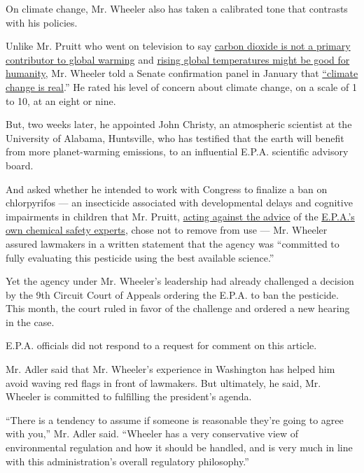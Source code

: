 On climate change, Mr. Wheeler also has taken a calibrated tone that
contrasts with his policies.

Unlike Mr. Pruitt who went on television to say
\href{https://www.nytimes.com/2017/03/09/us/politics/epa-scott-pruitt-global-warming.html}{carbon
dioxide is not a primary contributor to global warming} and
\href{https://www.nytimes.com/2018/02/08/climate/pruitt-climate-change.html}{rising
global temperatures might be good for humanity}, Mr. Wheeler told a
Senate confirmation panel in January that
\href{https://www.nytimes.com/2019/01/16/climate/wheeler-senate-epa-confirmation-hearing.html}{``climate
change is real}.'' He rated his level of concern about climate change,
on a scale of 1 to 10, at an eight or nine.

But, two weeks later, he appointed John Christy, an atmospheric
scientist at the University of Alabama, Huntsville, who has testified
that the earth will benefit from more planet-warming emissions, to an
influential E.P.A. scientific advisory board.

And asked whether he intended to work with Congress to finalize a ban on
chlorpyrifos --- an insecticide associated with developmental delays and
cognitive impairments in children that Mr. Pruitt,
\href{https://www.nytimes.com/2017/03/29/us/politics/epa-insecticide-chlorpyrifos.html}{acting
against the advice} of the
\href{https://www.regulations.gov/document?D=EPA-HQ-OPP-2015-0653-0001}{E.P.A.'s
own chemical safety experts}, chose not to remove from use --- Mr.
Wheeler assured lawmakers in a written statement that the agency was
``committed to fully evaluating this pesticide using the best available
science.''

Yet the agency under Mr. Wheeler's leadership had already challenged a
decision by the 9th Circuit Court of Appeals ordering the E.P.A. to ban
the pesticide. This month, the court ruled in favor of the challenge and
ordered a new hearing in the case.

E.P.A. officials did not respond to a request for comment on this
article.

Mr. Adler said that Mr. Wheeler's experience in Washington has helped
him avoid waving red flags in front of lawmakers. But ultimately, he
said, Mr. Wheeler is committed to fulfilling the president's agenda.

``There is a tendency to assume if someone is reasonable they're going
to agree with you,'' Mr. Adler said. ``Wheeler has a very conservative
view of environmental regulation and how it should be handled, and is
very much in line with this administration's overall regulatory
philosophy.''

